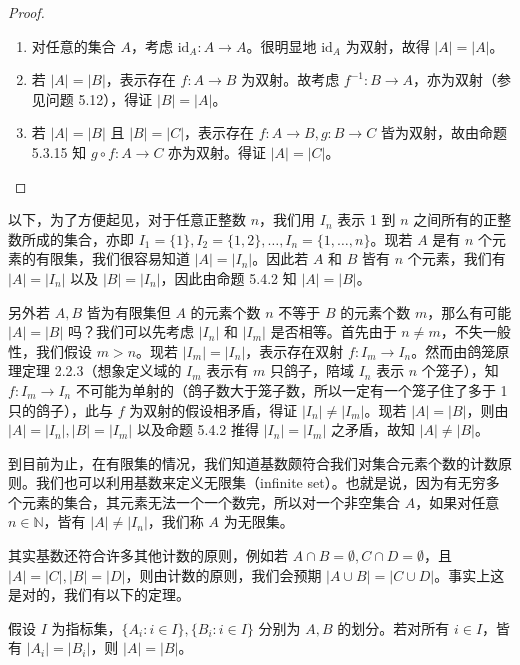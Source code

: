 \begin{proof}
\begin{enumerate}
    \item 对任意的集合 $A$，考虑 $\mathrm{id}_A : A \to A$。很明显地 $\mathrm{id}_A$ 为双射，故得 $|A| = |A|$。
    \item 若 $|A| = |B|$，表示存在 $f : A \to B$ 为双射。故考虑 $f^{-1} : B \to A$，亦为双射（参见问题 5.12），得证 $|B| = |A|$。
    \item 若 $|A| = |B|$ 且 $|B| = |C|$，表示存在 $f : A \to B, g : B \to C$ 皆为双射，故由命题 5.3.15 知 $g \circ f : A \to C$ 亦为双射。得证 $|A| = |C|$。
\end{enumerate}
\end{proof}

以下，为了方便起见，对于任意正整数 $n$，我们用 $I_n$ 表示 1 到 $n$ 之间所有的正整数所成的集合，亦即 $I_1 = \{1\}, I_2 = \{1, 2\}, \dots, I_n = \{1, \dots, n\}$。现若 $A$ 是有 $n$ 个元素的有限集，我们很容易知道 $|A| = |I_n|$。因此若 $A$ 和 $B$ 皆有 $n$ 个元素，我们有 $|A| = |I_n|$ 以及 $|B| = |I_n|$，因此由命题 5.4.2 知 $|A| = |B|$。

另外若 $A, B$ 皆为有限集但 $A$ 的元素个数 $n$ 不等于 $B$ 的元素个数 $m$，那么有可能 $|A| = |B|$ 吗？我们可以先考虑 $|I_n|$ 和 $|I_m|$ 是否相等。首先由于 $n \neq m$，不失一般性，我们假设 $m > n$。现若 $|I_m| = |I_n|$，表示存在双射 $f : I_m \to I_n$。然而由鸽笼原理定理 2.2.3（想象定义域的 $I_m$ 表示有 $m$ 只鸽子，陪域 $I_n$ 表示 $n$ 个笼子），知 $f : I_m \to I_n$ 不可能为单射的（鸽子数大于笼子数，所以一定有一个笼子住了多于 1 只的鸽子），此与 $f$ 为双射的假设相矛盾，得证 $|I_n| \neq |I_m|$。现若 $|A| = |B|$，则由 $|A| = |I_n|, |B| = |I_m|$ 以及命题 5.4.2 推得 $|I_n| = |I_m|$ 之矛盾，故知 $|A| \neq |B|$。

到目前为止，在有限集的情况，我们知道基数颇符合我们对集合元素个数的计数原则。我们也可以利用基数来定义无限集（infinite set）。也就是说，因为有无穷多个元素的集合，其元素无法一个一个数完，所以对一个非空集合 $A$，如果对任意 $n \in \mathbb{N}$，皆有 $|A| \neq |I_n|$，我们称 $A$ 为无限集。

其实基数还符合许多其他计数的原则，例如若 $A \cap B = \emptyset, C \cap D = \emptyset$，且 $|A| = |C|, |B| = |D|$，则由计数的原则，我们会预期 $|A \cup B| = |C \cup D|$。事实上这是对的，我们有以下的定理。

\begin{lemma}
假设 $I$ 为指标集，$\{A_i : i \in I\}, \{B_i : i \in I\}$ 分别为 $A, B$ 的划分。若对所有 $i \in I$，皆有 $|A_i| = |B_i|$，则 $|A| = |B|$。
\end{lemma}

